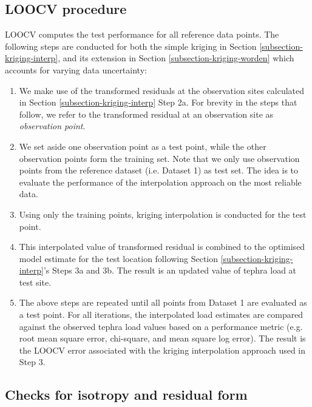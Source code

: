 \documentclass[a4paper,fleqn]{cas-sc}
\begin{document}
\subsection{LOOCV procedure} \label{supp-loocv}


    LOOCV computes the test performance for all reference data points. The following steps are conducted for both the simple kriging in Section \ref{subsection-kriging-interp}, and its extension in Section \ref{subsection-kriging-worden} which accounts for varying data uncertainty: 
  
        \begin{enumerate}
  
        \item We make use of the transformed residuals at the observation sites calculated in Section \ref{subsection-kriging-interp} Step 2a. For brevity in the steps that follow, we refer to the transformed residual at an observation site as \textit{observation point}.
    
        \item We set aside one observation point as a test point, while the other observation points form the training set. Note that we only use observation points from the reference dataset (i.e. Dataset 1) as test set. The idea is to evaluate the performance of the interpolation approach on the most reliable data.
  
        \item Using only the training points, kriging interpolation is conducted for the test point.
    
        \item This interpolated value of transformed residual is combined to the optimised model estimate for the test location following Section \ref{subsection-kriging-interp}'s Steps 3a and 3b. The result is an updated value of tephra load at test site. 
    
        \item The above steps are repeated until all points from Dataset 1 are evaluated as a test point. For all iterations, the interpolated load estimates are compared against the observed tephra load values based on a performance metric (e.g. root mean square error, chi-square, and mean square log error). The result is the LOOCV error associated with the kriging interpolation approach used in Step 3.

        \end{enumerate}
  
  
\subsection{Checks for isotropy and residual form} \label{supp-isotrop}
\end{document}
